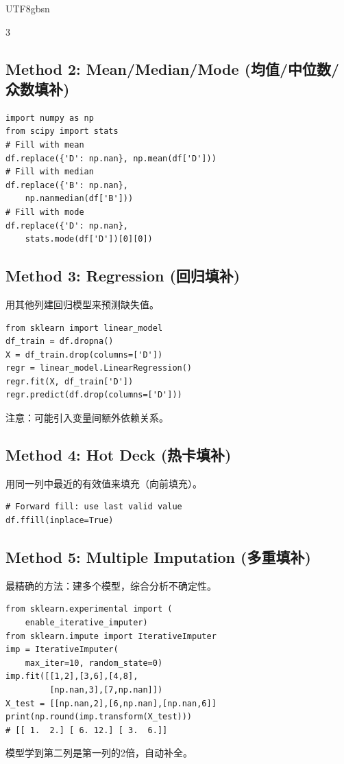 \documentclass[10pt,landscape,a4paper]{article}
\newcommand{\zhint}[1]{{\scriptsize\color{gray!70!black}#1}}
\begin{document}
\begin{CJK}{UTF8}{gbsn}
\begin{multicols}{3}
\subsection{Method 2: Mean/Median/Mode \zhint{(均值/中位数/众数填补)}}
\begin{lstlisting}
import numpy as np
from scipy import stats
# Fill with mean
df.replace({'D': np.nan}, np.mean(df['D']))
# Fill with median
df.replace({'B': np.nan},
    np.nanmedian(df['B']))
# Fill with mode
df.replace({'D': np.nan},
    stats.mode(df['D'])[0][0])
\end{lstlisting}

\subsection{Method 3: Regression \zhint{(回归填补)}}
\zhint{用其他列建回归模型来预测缺失值。}
\begin{lstlisting}
from sklearn import linear_model
df_train = df.dropna()
X = df_train.drop(columns=['D'])
regr = linear_model.LinearRegression()
regr.fit(X, df_train['D'])
regr.predict(df.drop(columns=['D']))
\end{lstlisting}
\zhint{注意：可能引入变量间额外依赖关系。}

\subsection{Method 4: Hot Deck \zhint{(热卡填补)}}
\zhint{用同一列中最近的有效值来填充（向前填充）。}
\begin{lstlisting}
# Forward fill: use last valid value
df.ffill(inplace=True)
\end{lstlisting}

\subsection{Method 5: Multiple Imputation \zhint{(多重填补)}}
\zhint{最精确的方法：建多个模型，综合分析不确定性。}
\begin{lstlisting}
from sklearn.experimental import (
    enable_iterative_imputer)
from sklearn.impute import IterativeImputer
imp = IterativeImputer(
    max_iter=10, random_state=0)
imp.fit([[1,2],[3,6],[4,8],
         [np.nan,3],[7,np.nan]])
X_test = [[np.nan,2],[6,np.nan],[np.nan,6]]
print(np.round(imp.transform(X_test)))
# [[ 1.  2.] [ 6. 12.] [ 3.  6.]]
\end{lstlisting}
\zhint{模型学到第二列是第一列的2倍，自动补全。}


\end{multicols}
\end{CJK}
\end{document}
